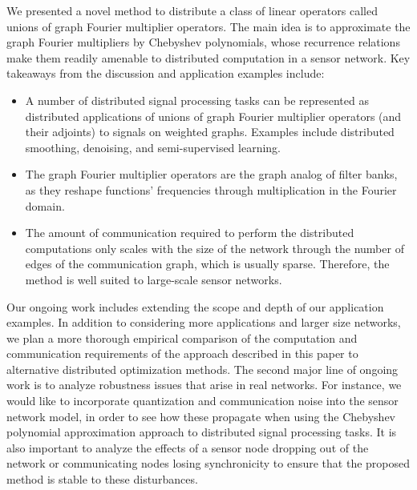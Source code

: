 \documentclass[conference]{IEEEtran}
\begin{document}
We presented a novel method to distribute a class of linear operators called unions of graph Fourier multiplier operators. The main idea is to approximate the graph Fourier multipliers by Chebyshev polynomials, whose recurrence relations make them readily amenable to distributed computation in a sensor network. Key takeaways from the discussion and application examples include:
\begin{itemize}
\item A number of distributed signal processing tasks can be represented as distributed applications of unions of graph Fourier multiplier operators (and their adjoints) to signals on weighted graphs. Examples include distributed smoothing, denoising, and semi-supervised learning.
\item The graph Fourier multiplier operators are the graph analog of filter banks, as they reshape functions' frequencies through multiplication in the Fourier domain.
\item The amount of communication required to perform the distributed computations only scales with the size of the network through the number of edges of the communication graph, which is usually sparse. Therefore, the method is well suited to large-scale sensor networks.
\end{itemize}

Our ongoing work includes extending the scope and depth of our application examples. In addition to considering more applications and larger size networks, we plan a more thorough empirical comparison of the computation and communication requirements of the approach described in this paper to alternative distributed optimization methods. The second major line of ongoing work is to analyze robustness issues that arise in real networks. For instance, we would like to incorporate quantization and communication noise into the sensor network model, in order to see how these propagate when using the Chebyshev polynomial approximation approach to distributed signal processing tasks. It is also important to analyze the effects of a sensor node dropping out of the network or communicating nodes losing synchronicity to ensure that the proposed method is stable to these disturbances.

















\end{document}
